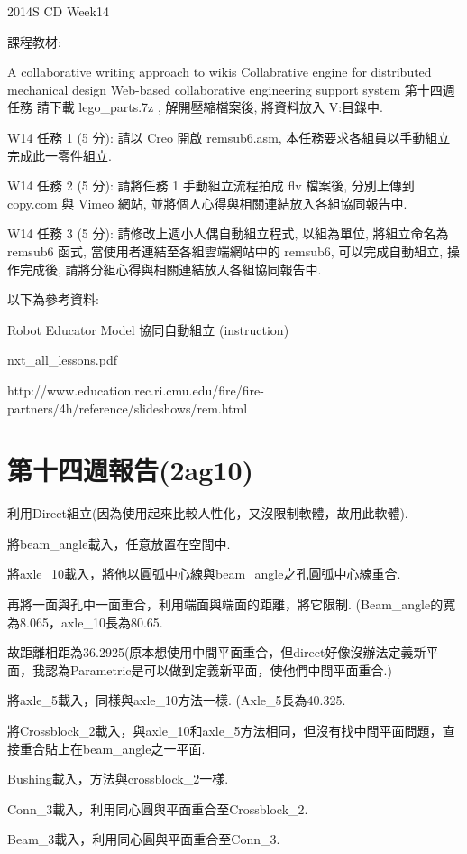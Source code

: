 \documentclass[]{article}
\begin{document}
2014S CD Week14

課程教材:

A collaborative writing approach to wikis Collabrative engine for
distributed mechanical design Web-based collaborative engineering
support system 第十四週任務 請下載 lego\_parts.7z , 解開壓縮檔案後,
將資料放入 V:\home\lego 目錄中.

W14 任務 1 (5 分): 請以 Creo 開啟 remsub6.asm,
本任務要求各組員以手動組立完成此一零件組立.

W14 任務 2 (5 分): 請將任務 1 手動組立流程拍成 flv 檔案後, 分別上傳到
copy.com 與 Vimeo 網站, 並將個人心得與相關連結放入各組協同報告中.

W14 任務 3 (5 分): 請修改上週小人偶自動組立程式, 以組為單位,
將組立命名為 remsub6 函式, 當使用者連結至各組雲端網站中的 remsub6,
可以完成自動組立, 操作完成後, 請將分組心得與相關連結放入各組協同報告中.

以下為參考資料:

Robot Educator Model 協同自動組立 (instruction)

nxt\_all\_lessons.pdf

http://www.education.rec.ri.cmu.edu/fire/fire-partners/4h/reference/slideshows/rem.html

\section{第十四週報告(2ag10)}\label{ux7b2cux5341ux56dbux9031ux5831ux544a2ag10}

利用Direct組立(因為使用起來比較人性化，又沒限制軟體，故用此軟體).

將beam\_angle載入，任意放置在空間中.

將axle\_10載入，將他以圓弧中心線與beam\_angle之孔圓弧中心線重合.

再將一面與孔中一面重合，利用端面與端面的距離，將它限制.
(Beam\_angle的寬為8.065，axle\_10長為80.65.

故距離相距為36.2925(原本想使用中間平面重合，但direct好像沒辦法定義新平面，我認為Parametric是可以做到定義新平面，使他們中間平面重合.)

將axle\_5載入，同樣與axle\_10方法一樣. (Axle\_5長為40.325.

將Crossblock\_2載入，與axle\_10和axle\_5方法相同，但沒有找中間平面問題，直接重合貼上在beam\_angle之一平面.

Bushing載入，方法與crossblock\_2一樣.

Conn\_3載入，利用同心圓與平面重合至Crossblock\_2.

Beam\_3載入，利用同心圓與平面重合至Conn\_3.
\end{document}
